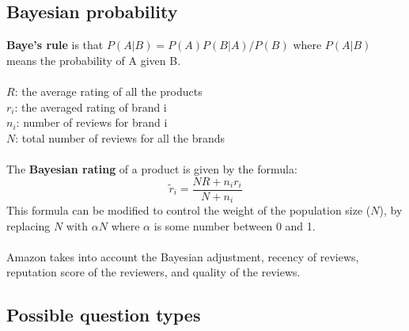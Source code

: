 \documentclass{article}
\begin{document}
\subsection{Bayesian probability}

\textbf{Baye's rule} is that $P(A|B) = P(A)P(B|A)/P(B)$ where $P(A|B)$ means the probability of A given B. \\
\\
$R$: the average rating of all the products \\
$r_i$: the averaged rating of brand i \\
$n_i$: number of reviews for brand i \\
$N$: total number of reviews for all the brands \\
\\
The \textbf{Bayesian rating} of a product is given by the formula:
$$\tilde{r}_i = \frac{NR + n_ir_i}{N + n_i}$$
This formula can be modified to control the weight of the population size ($N$), by replacing $N$ with $\alpha N$ where $\alpha$ is some number between 0 and 1. \\
\\
Amazon takes into account the Bayesian adjustment, recency of reviews, reputation score of the reviewers, and quality of the reviews. \\

\subsection{Possible question types}
\end{document}

